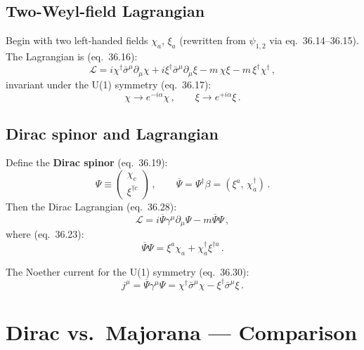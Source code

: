 \subsection{Two-Weyl-field Lagrangian}

Begin with two left-handed fields $\chi_a$, $\xi_a$ (rewritten from $\psi_{1,2}$
via eq.~36.14--36.15). The Lagrangian is (eq.~36.16):
\begin{equation}
  \mathcal{L}
  = i\chi^\dagger\bar{\sigma}^\mu\partial_\mu\chi
  + i\xi^\dagger\bar{\sigma}^\mu\partial_\mu\xi
  - m\,\chi\xi - m\,\xi^\dagger\chi^\dagger\,,
  \tag{36.16}
\end{equation}
invariant under the U(1) symmetry (eq.~36.17):
\begin{equation}
  \chi \to e^{-i\alpha}\chi\,, \qquad \xi \to e^{+i\alpha}\xi\,.
  \tag{36.17}
\end{equation}

\subsection{Dirac spinor and Lagrangian}

Define the \textbf{Dirac spinor} (eq.~36.19):
\begin{equation}
  \Psi \equiv \begin{pmatrix}\chi_c\\\xi^{\dagger\dot{c}}\end{pmatrix}\,,
  \qquad
  \overline{\Psi} = \Psi^\dagger\beta = (\xi^a,\,\chi^\dagger_{\dot{a}})\,.
  \tag{36.19, 36.22}
\end{equation}
Then the Dirac Lagrangian (eq.~36.28):
\begin{equation}
  \boxed{\mathcal{L} = i\overline{\Psi}\gamma^\mu\partial_\mu\Psi - m\overline{\Psi}\Psi\,,}
  \tag{36.28}
\end{equation}
where (eq.~36.23):
\begin{equation}
  \overline{\Psi}\Psi = \xi^a\chi_a + \chi^\dagger_{\dot{a}}\xi^{\dagger\dot{a}}\,.
  \tag{36.23}
\end{equation}

The Noether current for the U(1) symmetry (eq.~36.30):
\begin{equation}
  j^\mu = \overline{\Psi}\gamma^\mu\Psi
        = \chi^\dagger\bar{\sigma}^\mu\chi - \xi^\dagger\bar{\sigma}^\mu\xi\,.
  \tag{36.30}
\end{equation}

\section{Dirac vs.\ Majorana --- Comparison}


